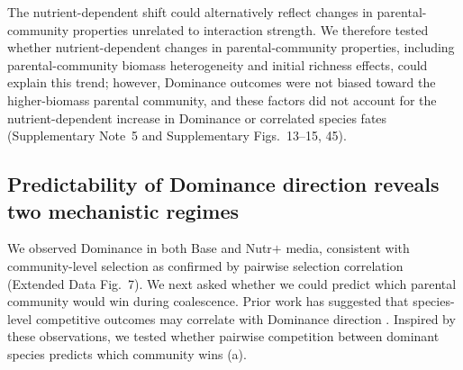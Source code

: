 The nutrient-dependent shift could alternatively reflect changes in parental-community properties unrelated to interaction strength. We therefore tested whether nutrient-dependent changes in parental-community properties, including parental-community biomass heterogeneity and initial richness effects, could explain this trend; however, Dominance outcomes were not biased toward the higher-biomass parental community, and these factors did not account for the nutrient-dependent increase in Dominance or correlated species fates (Supplementary Note~5 and Supplementary Figs.~13--15, 45).


\subsection{Predictability of Dominance direction reveals two mechanistic regimes}
\label{sec:results:predictability}

We observed Dominance in both Base and Nutr$+$ media, consistent with community-level selection as confirmed by pairwise selection correlation (Extended Data Fig.~7). We next asked whether we could predict which parental community would win during coalescence. Prior work has suggested that species-level competitive outcomes may correlate with Dominance direction \citep{Rillig2015, Castledine2020}. Inspired by these observations, we tested whether pairwise competition between dominant species \citep{Hu2022, Ratzke2020} predicts which community wins (a).

